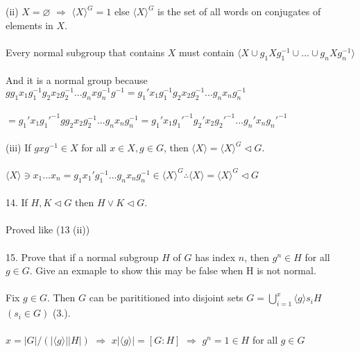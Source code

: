 \documentclass{article}
\begin{document}
\begin{siderules}
\color{blue}(ii) \(X=\varnothing\) \(\Longrightarrow\) \(\langle X\rangle^{G}=1\) else \(\langle X\rangle^{G}\) is the set of all words on conjugates of elements in \(X\).\\\\\color{black}
\null\qquad Every normal subgroup that contains \(X\) must contain \(\langle X \cup g_{1}Xg_{1}^{-1}\cup...\cup g_{n}Xg_{n}^{-1} \rangle\)\\\\
\null\qquad And it is a normal group because \(gg_{1}x_{1}g_{1}^{-1}g_{2}x_{2}g_{2}^{-1}...g_{n}xg_{n}^{-1}g^{-1}=g_{1}'x_{1}g_{1}^{-1}g_{2}x_{2}g_{2}^{-1}...g_{n}x_{n}g_{n}^{-1}\)\\\\
\null\qquad \(=g_{1}'x_{1}g_{1}'^{-1}gg_{2}x_{2}g_{2}^{-1}...g_{n}x_{n}g_{n}^{-1}=g_{1}'x_{1}g_{1}'^{-1}g_{2}'x_{2}g_{2}'^{-1}...g_{n}'x_{n}g_{n}'^{-1}\)\\\\
\color{blue}(iii) If \(gxg^{-1}\in X\) for all \(x\in X,g\in G\), then \(\langle X\rangle=\langle X\rangle^{G}\vartriangleleft G\).\\\\\color{black}
\null\qquad\(\langle X\rangle\ni x_{1}...x_{n}=g_{1}x_{1}'g_{1}^{-1}...g_{n}x_{n}g_{n}^{-1}\in \langle X\rangle^{G} \therefore \langle X\rangle=\langle X\rangle^{G}\vartriangleleft G\)\\\\
\color{blue}14. If \(H,K\vartriangleleft G\) then \(H\lor K\vartriangleleft G\).\\\\\color{black}
\null\qquad Proved like \color{gray}(13 (ii))\color{black}\\\\
\color{blue}15. Prove that if a normal subgroup \(H\) of \(G\) has index \(n\), then \(g^{n}\in H\) for all \(g\in G\). Give an exmaple to show this may be false when H is not normal.\\\\\color{black}
\null\qquad Fix \(g\in G\). Then \(G\) can be parititioned into disjoint sets \(G=\bigcup^{x}_{i=1} \langle g\rangle s_{i} H\) \((s_{i}\in G)\) \color{gray}(3.)\color{black}.\\\\
\null\qquad \(x=|G|/(|\langle g\rangle||H|)\) \(\Longrightarrow\) \(x|\langle g\rangle|=[G:H]\) \(\Longrightarrow\) \(g^{n}=1\in H\) for all \(g\in G\)
\end{siderules}
\end{document}
